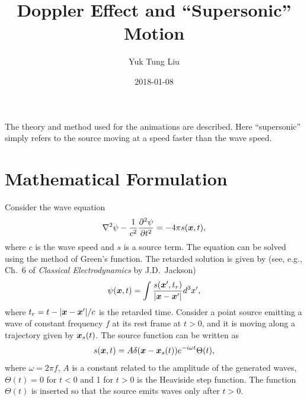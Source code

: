 \documentclass[12pt]{article}
\newcommand \beq {\begin{equation}}
\newcommand \eeq {\end{equation}}
\newcommand{\ve}[1]{\mbox{\boldmath $#1$}}
\begin{document}
\title{Doppler Effect and ``Supersonic'' Motion}
\author{Yuk Tung Liu}
\date{2018-01-08}
\maketitle

The theory and method used for the animations are described. Here ``supersonic'' 
simply refers to the source moving at a speed faster than the wave speed.

\section{Mathematical Formulation}

Consider the wave equation 
\beq
  \nabla^2 \psi - \frac{1}{c^2} \frac{\partial^2 \psi}{\partial t^2} 
= -4\pi s(\ve{x},t) ,
\label{eq:wave}
\eeq
where $c$ is the wave speed and $s$ is a source term. The equation can be 
solved using the method of Green's function. The retarded solution 
is given by (see, e.g., Ch.~6 of 
{\it Classical Electrodynamics} by J.D.~Jackson) 
\beq
  \psi(\ve{x},t) = \int \frac{s(\ve{x}',t_r)}{|\ve{x}-\ve{x}'|} d^3 x' ,
\label{eq:psi_solution}
\eeq
where $t_r = t-|\ve{x}-\ve{x}'|/c$ is the retarded time. Consider a point 
source emitting a wave of constant frequency $f$ at its rest frame at 
$t > 0$, and it is moving along a trajectory given by $\ve{x}_s(t)$. 
The source function can be written as 
\beq
  s(\ve{x},t) = A \delta(\ve{x}-\ve{x}_s(t)) e^{-i\omega t} \Theta(t) ,
\label{eq:f}
\eeq
where $\omega = 2\pi f$, $A$ is a constant related to the amplitude of the 
generated waves, $\Theta(t)=0$ for $t<0$ and 1 for $t>0$ is 
the Heaviside step function. The function $\Theta(t)$ is inserted so that 
the source emits waves only after $t>0$.
\end{document}
